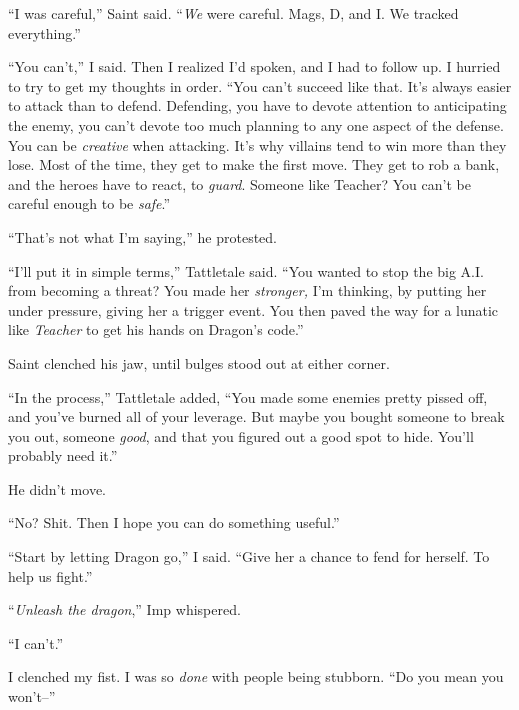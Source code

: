 ``I was careful,'' Saint said.  ``\emph{We} were careful.  Mags, D, and I.  We tracked everything.''



``You can't,'' I said.  Then I realized I'd spoken, and I had to follow up.  I hurried to try to get my thoughts in order.  ``You can't succeed like that.  It's always easier to attack than to defend.  Defending, you have to devote attention to anticipating the enemy, you can't devote too much planning to any one aspect of the defense.  You can be \emph{creative} when attacking.  It's why villains tend to win more than they lose.  Most of the time, they get to make the first move.  They get to rob a bank, and the heroes have to react, to \emph{guard}.  Someone like Teacher?  You can't be careful enough to be \emph{safe}.''



``That's not what I'm saying,'' he protested.



``I'll put it in simple terms,'' Tattletale said.  ``You wanted to stop the big A.I. from becoming a threat?  You made her \emph{stronger, }I'm thinking, by putting her under pressure, giving her a trigger event.  You then paved the way for a lunatic like \emph{Teacher }to get his hands on Dragon's code.''



Saint clenched his jaw, until bulges stood out at either corner.



``In the process,'' Tattletale added, ``You made some enemies pretty pissed off, and you've burned all of your leverage.  But maybe you bought someone to break you out, someone \emph{good}, and that you figured out a good spot to hide.  You'll probably need it.''



He didn't move.



``No?  Shit.  Then I hope you can do something useful.''



``Start by letting Dragon go,'' I said.  ``Give her a chance to fend for herself.  To help us fight.''



``\emph{Unleash the dragon},'' Imp whispered.



``I can't.''



I clenched my fist.  I was so \emph{done} with people being stubborn.  ``Do you mean you won't--''




